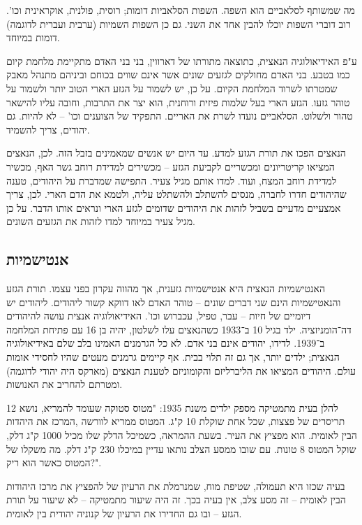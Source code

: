 \documentclass[]{article}
\begin{document}
	מה שמשותף לסלאביים הוא השפה. השפות הסלאביות דומות; רוסית, פולנית, אוקראינית וכו'. רוב דוברי השפות יוכלו להבין אחד את השני. גם כן השפות השמיות (ערבית ועברית לדוגמה) דומות במיוחד. 
	
	ע"פ האידיאולוגיה הנאצית, כתוצאה מתורתו של דארווין, בני בני האדם מתקיימת מלחמת קיום כמו בטבע. בני האדם מחולקים לגזעים שונים אשר אינם שווים בכוחם וביניהם מתנהל מאבק שמטרתו לשרוד המלחמת הקיום. על כן, יש לשמור על הגזע הארי הטוב יותר ולשמור על טוהר גזעו. הגזע הארי בעל שלמות פיזית ורוחנית, הוא יצר את התרבות, וחובה עליו להישאר טהור ולשלוט. הסלאביים נועדו לשרת את האריים. התפקיד של הצוענים וכו' – לא להיות. גם יהודים, צריך להשמיד. 
	
	הנאצים הפכו את תורת הגזע למדע. עד היום יש אנשים שמאמינים בזבל הזה. לכן, הנאצים המציאו קריטריונים ומכשריים לקביעת הגזע – מכשירים למדידת רוחב גשר האף, מכשיר למדידת רוחב המצח, ועוד. למדו אותם מגיל צעיר. התפישה שמדברת על היהודים, טענה שהיהודים חדרו לחברה, מנסים להשתלב ולהשתלט עליה, ולטמא את הדם הארי. לכן, צריך אמצעיים מדעיים בשביל לזהות את היהודים שדומים לגזע הארי ונראים אותו הדבר. על כן מגיל צעיר במיוחד למדו לזהות את הגזעים השונים. 
	
	\subsection{אנטישמיות}
	האנטישמיות הנאצית היא אנטישמיות גזענית, אך מהווה עקרון בפני עצמו. תורת הגזע והנאטישמיות הינם שני דברים שונים – טוהר האדם לאו דווקא קשור ליהודים. ליהודים יש דיומיים של חיות – עבר, טפיל, עכברוש וכו'. האידיאולוגיה אנצית עושה להיהודים דה־הומניזציה. ילד בגיל 10 ב־1933 כשהנאצים עלו לשלטון, יהיה בן 16 עם פתיחת המלחמה ב־1939. לדידו, יהודים אינם בני אדם. לא כל הגרמנים האמינו בלב שלם באידיאולוגיה הנאצית; ילדים יותר, אך גם זה תלוי בבית. אף קיימים גרמנים מעטים שהיו לחסידי אומות עולם. היהודים המציאו את הליברליזם והקומוניזם לטענת הנאצים (מארקס היה יהודי לדוגמה) ומטרתם להחריב את האנושות. 
	
	להלן בעית מתמטיקה מספק ילדים משנת 1935: 
	"מטוס סטוקה שעומד להמריא, נושא 12 תריסרים של פצצות, שכל אחת שוקלת 10 ק"ג. המטוס ממריא לוורשה ,המרכז את היהדות הבין לאומית. הוא מפציץ את העיר. בשעת ההמראה, כשמיכל הדלק שלו מכיל 1000 ק"ג דלק, שוקל המטוס 8 טונות. עם שובו ממסע הצלב נותאו עדיין במיכלו 230 ק"ג דלק. מה משקלו של המטוס כאשר הוא ריק?". 
	
	בעיה שכזו היא תעמולה, שטיפת מוח, שמנרמלת את הרעיון של להפציץ את מרכז היהודות הבין לאומית – זה מסע צלב, אין בעיה בכך. זה היה שיעור מתמטיקה – לא שיעור על תורת הגזע – ובו גם החדירו את הרעיון של קנוניה יהודית בין לאומית. 
	
\end{document}

